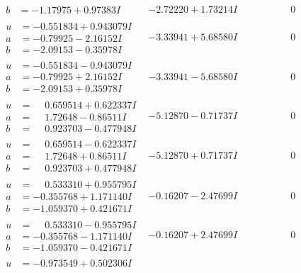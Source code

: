 \documentclass[1p]{elsarticle_modified}
\theoremstyle{definition}
\begin{document}
$$\begin{array}{c|c|c}
\begin{aligned}
b &= -1.17975 + 0.97383 I\end{aligned}
 & -2.72220 + 1.73214 I & \phantom{-0.000000 } 0 \\ \hline\begin{aligned}
u &= -0.551834 + 0.943079 I \\
a &= -0.79925 - 2.16152 I \\
b &= -2.09153 - 0.35978 I\end{aligned}
 & -3.33941 + 5.68580 I & \phantom{-0.000000 } 0 \\ \hline\begin{aligned}
u &= -0.551834 - 0.943079 I \\
a &= -0.79925 + 2.16152 I \\
b &= -2.09153 + 0.35978 I\end{aligned}
 & -3.33941 - 5.68580 I & \phantom{-0.000000 } 0 \\ \hline\begin{aligned}
u &= \phantom{-}0.659514 + 0.622337 I \\
a &= \phantom{-}1.72648 - 0.86511 I \\
b &= \phantom{-}0.923703 - 0.477948 I\end{aligned}
 & -5.12870 - 0.71737 I & \phantom{-0.000000 } 0 \\ \hline\begin{aligned}
u &= \phantom{-}0.659514 - 0.622337 I \\
a &= \phantom{-}1.72648 + 0.86511 I \\
b &= \phantom{-}0.923703 + 0.477948 I\end{aligned}
 & -5.12870 + 0.71737 I & \phantom{-0.000000 } 0 \\ \hline\begin{aligned}
u &= \phantom{-}0.533310 + 0.955795 I \\
a &= -0.355768 + 1.171140 I \\
b &= -1.059370 + 0.421671 I\end{aligned}
 & -0.16207 - 2.47699 I & \phantom{-0.000000 } 0 \\ \hline\begin{aligned}
u &= \phantom{-}0.533310 - 0.955795 I \\
a &= -0.355768 - 1.171140 I \\
b &= -1.059370 - 0.421671 I\end{aligned}
 & -0.16207 + 2.47699 I & \phantom{-0.000000 } 0 \\ \hline\begin{aligned}
u &= -0.973549 + 0.502306 I \\

\end{aligned}
\end{array}$$
\end{document}
